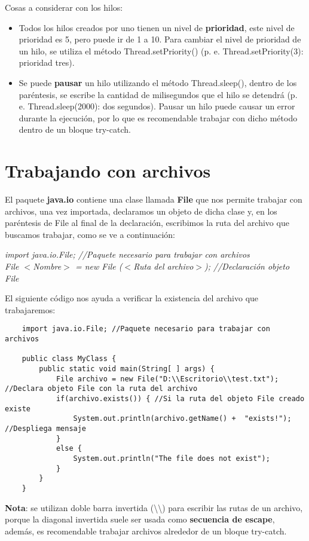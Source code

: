 Cosas a considerar con los hilos:
\begin{itemize}
    \item Todos los hilos creados por uno tienen un nivel de \textbf{prioridad}, este nivel de prioridad es 5, pero puede ir de 1 a 10. Para cambiar el nivel de prioridad de un hilo, se utiliza el método Thread.setPriority() (p. e. Thread.setPriority(3): prioridad tres).
    \item Se puede \textbf{pausar} un hilo utilizando el método Thread.sleep(), dentro de los paréntesis, se escribe la cantidad de milisegundos que el hilo se detendrá (p. e. Thread.sleep(2000): dos segundos). Pausar un hilo puede causar un error durante la ejecución, por lo que es recomendable trabajar con dicho método dentro de un bloque try-catch.
\end{itemize}



\section{Trabajando con archivos}
El paquete \textbf{java.io} contiene una clase llamada \textbf{File} que nos permite trabajar con archivos, una vez importada, declaramos un objeto de dicha clase y, en los paréntesis de File al final de la declaración, escribimos la ruta del archivo que buscamos trabajar, como se ve a continuación:
\begin{center}\textit{import java.io.File; //Paquete necesario para trabajar con archivos\\File $<$Nombre$>$ = new File ($<$Ruta del archivo$>$); //Declaración objeto File}\end{center}
El siguiente código nos ayuda a verificar la existencia del archivo que trabajaremos:
\begin{lstlisting}
    import java.io.File; //Paquete necesario para trabajar con archivos

    public class MyClass {
        public static void main(String[ ] args) {
            File archivo = new File("D:\\Escritorio\\test.txt"); //Declara objeto File con la ruta del archivo
            if(archivo.exists()) { //Si la ruta del objeto File creado existe
                System.out.println(archivo.getName() +  "exists!"); //Despliega mensaje
            }
            else { 
                System.out.println("The file does not exist");
            }
        }
    }
\end{lstlisting}
\textbf{Nota}: se utilizan doble barra invertida (\textbackslash\textbackslash) para escribir las rutas de un archivo, porque la diagonal invertida suele ser usada como \textbf{secuencia de escape}, además, es recomendable trabajar archivos alrededor de un bloque try-catch.

